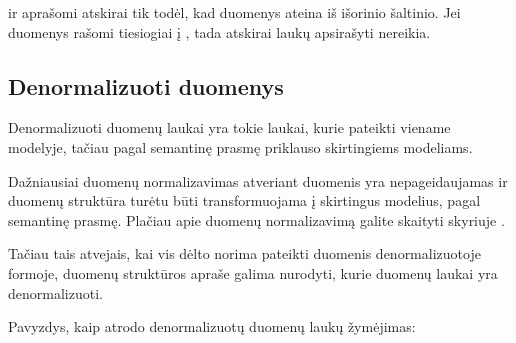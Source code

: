 \documentclass[letterpaper,10pt,lithuanian]{sphinxmanual}
\begin{document}
\sphinxAtStartPar
{} ir  aprašomi atskirai tik todėl, kad duomenys
ateina iš išorinio šaltinio. Jei duomenys rašomi tiesiogiai į , tada atskirai  laukų apsirašyti nereikia.


\subsection{Denormalizuoti duomenys}
\label{\detokenize{identifikatoriai:denormalizuoti-duomenys}}\label{\detokenize{identifikatoriai:ref-denorm}}
\sphinxAtStartPar
Denormalizuoti duomenų laukai yra tokie laukai, kurie pateikti viename
modelyje, tačiau pagal semantinę prasmę priklauso skirtingiems modeliams.

\sphinxAtStartPar
Dažniausiai duomenų normalizavimas atveriant duomenis yra nepageidaujamas ir
duomenų struktūra turėtu būti transformuojama į skirtingus modelius, pagal
semantinę prasmę. Plačiau apie duomenų normalizavimą galite skaityti skyriuje
.

\sphinxAtStartPar
Tačiau tais atvejais, kai vis dėlto norima pateikti duomenis denormalizuotoje
formoje, duomenų struktūros apraše galima nurodyti, kurie duomenų laukai yra
denormalizuoti.

\sphinxAtStartPar
Pavyzdys, kaip atrodo denormalizuotų duomenų laukų žymėjimas:
\end{document}
